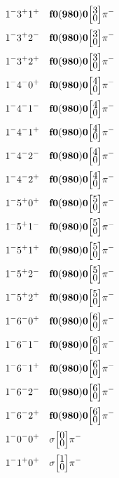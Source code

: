 \documentclass[10pt,a4paper]{article}
\def\dst{\displaystyle}
\def\vsp{\hbox{\vrule height12.5pt depth3.5pt width0pt}}
\def\ells#1#2{\Big[\hskip-5pt\vsp\begin{array}{c}\dst#1\\[-4pt]\dst#2\end{array}\vsp\hskip-5pt\Big]}
\begin{document}
\begin{align*} 
 \begin{aligned}
1^{-}3^{+}1^{+}\quad & {\bf f0(980)0}\ells{3}{0}\pi^-\\
1^{-}3^{+}2^{-}\quad & {\bf f0(980)0}\ells{3}{0}\pi^-\\
1^{-}3^{+}2^{+}\quad & {\bf f0(980)0}\ells{3}{0}\pi^-\\
1^{-}4^{-}0^{+}\quad & {\bf f0(980)0}\ells{4}{0}\pi^-\\
1^{-}4^{-}1^{-}\quad & {\bf f0(980)0}\ells{4}{0}\pi^-\\
1^{-}4^{-}1^{+}\quad & {\bf f0(980)0}\ells{4}{0}\pi^-\\
1^{-}4^{-}2^{-}\quad & {\bf f0(980)0}\ells{4}{0}\pi^-\\
1^{-}4^{-}2^{+}\quad & {\bf f0(980)0}\ells{4}{0}\pi^-\\
1^{-}5^{+}0^{+}\quad & {\bf f0(980)0}\ells{5}{0}\pi^-\\
1^{-}5^{+}1^{-}\quad & {\bf f0(980)0}\ells{5}{0}\pi^-\\
1^{-}5^{+}1^{+}\quad & {\bf f0(980)0}\ells{5}{0}\pi^-\\
1^{-}5^{+}2^{-}\quad & {\bf f0(980)0}\ells{5}{0}\pi^-\\
1^{-}5^{+}2^{+}\quad & {\bf f0(980)0}\ells{5}{0}\pi^-\\
1^{-}6^{-}0^{+}\quad & {\bf f0(980)0}\ells{6}{0}\pi^-\\
1^{-}6^{-}1^{-}\quad & {\bf f0(980)0}\ells{6}{0}\pi^-\\
1^{-}6^{-}1^{+}\quad & {\bf f0(980)0}\ells{6}{0}\pi^-\\
1^{-}6^{-}2^{-}\quad & {\bf f0(980)0}\ells{6}{0}\pi^-\\
1^{-}6^{-}2^{+}\quad & {\bf f0(980)0}\ells{6}{0}\pi^-\\
1^{-}0^{-}0^{+}\quad & \sigma\ells{0}{0}\pi^-\\
1^{-}1^{+}0^{+}\quad & \sigma\ells{1}{0}\pi^-\\
\end{aligned} 
 \end{align*}\pagebreak
\end{document}

